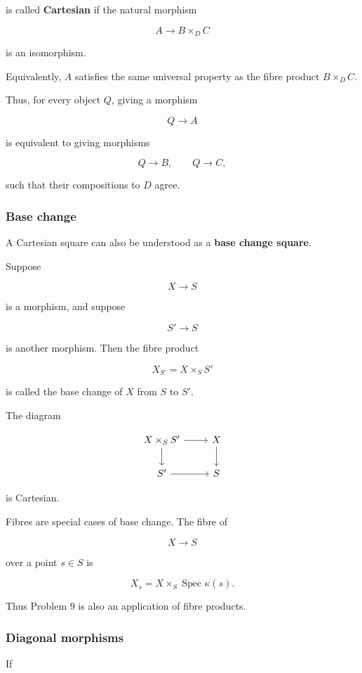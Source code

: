 \documentclass[12pt,a4paper]{article}
\theoremstyle{notespace}
\begin{document}
is called \textbf{Cartesian} if the natural morphism

\[
A\to B\times_D C
\]

is an isomorphism.

Equivalently, \(A\) satisfies the same universal property as the fibre product \(B\times_D C\).

Thus, for every object \(Q\), giving a morphism

\[
Q\to A
\]

is equivalent to giving morphisms

\[
Q\to B,
\qquad
Q\to C,
\]

such that their compositions to \(D\) agree.

\subsubsection{Base change}

A Cartesian square can also be understood as a \textbf{base change square}.

Suppose

\[
X\to S
\]

is a morphism, and suppose

\[
S'\to S
\]

is another morphism. Then the fibre product

\[
X_{S'}=X\times_S S'
\]

is called the base change of \(X\) from \(S\) to \(S'\).

The diagram

\[
\begin{tikzcd}
	X\times_S S' \arrow[r] \arrow[d] & X \arrow[d] \\
	S' \arrow[r] & S
\end{tikzcd}
\]

is Cartesian.

Fibres are special cases of base change. The fibre of

\[
X\to S
\]

over a point \(s\in S\) is

\[
X_s
=
X\times_S \operatorname{Spec}\kappa(s).
\]

Thus Problem 9 is also an application of fibre products.

\subsubsection{Diagonal morphisms}

If
\end{document}
